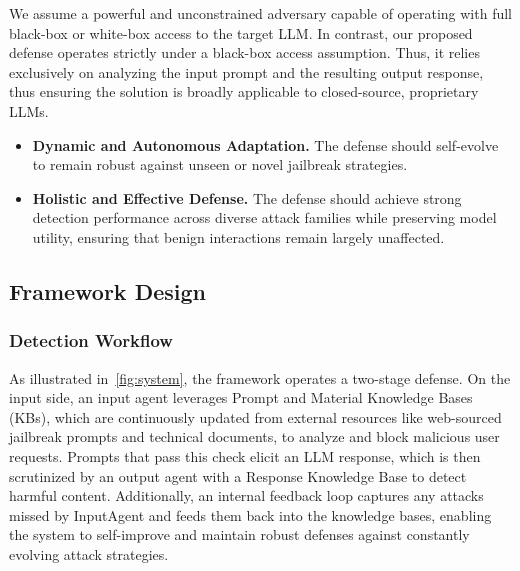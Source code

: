 \documentclass[letterpaper,twocolumn,10pt]{article}
\newcommand{\mypara}[1]{\noindent{\bf {#1}.} \xspace}
\newcommand{\inputagent}{InputAgent\xspace}
\begin{document}
We assume a powerful and unconstrained adversary capable of operating with full black-box or white-box access to the target LLM.
In contrast, our proposed defense operates strictly under a black-box access assumption.
Thus, it relies exclusively on analyzing the input prompt and the resulting output response, thus ensuring the solution is broadly applicable to closed-source, proprietary LLMs.

\mypara{Design Goals}
\begin{itemize}

    \item \textbf{Dynamic and Autonomous Adaptation.}
    The defense should self-evolve to remain robust against unseen or novel jailbreak strategies.

    \item \textbf{Holistic and Effective Defense.}
    The defense should achieve strong detection performance across diverse attack families while preserving model utility, ensuring that benign interactions remain largely unaffected.

\end{itemize}

\subsection{Framework Design}
\label{section:framework}

\subsubsection{Detection Workflow}

As illustrated in~\autoref{fig:system}, the framework operates a two-stage defense.
On the input side, an input agent leverages Prompt and Material Knowledge Bases (KBs), which are continuously updated from external resources like web-sourced jailbreak prompts and technical documents, to analyze and block malicious user requests.
Prompts that pass this check elicit an LLM response, which is then scrutinized by an output agent with a Response Knowledge Base to detect harmful content.
Additionally, an internal feedback loop captures any attacks missed by \inputagent and feeds them back into the knowledge bases, enabling the system to self-improve and maintain robust defenses against constantly evolving attack strategies.
\end{document}
